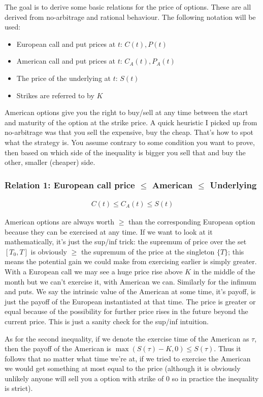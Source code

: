 \documentclass[9pt]{extarticle}
\begin{document}
The goal is to derive some basic relations for the price of options. These are all derived from no-arbitrage and rational behaviour. The following notation will be used:
\begin{itemize}
  \item European call and put prices at $t$: $C(t), P(t)$
  \item American call and put prices at $t$: $C_A(t), P_A(t)$
  \item The price of the underlying at $t$: $S(t)$
  \item Strikes are referred to by $K$
\end{itemize}
American options give you the right to buy/sell at any time between the start and maturity of the option at the strike price. A quick heuristic I picked up 
from no-arbitrage was that you sell the expensive, buy the cheap. That's how to spot what the strategy is. You assume contrary to some condition you want to prove, then 
based on which side of the inequality is bigger you sell that and buy the other, smaller (cheaper) side.
\subsubsection{Relation 1: European call price $\leq$ American $\leq$ Underlying}

\begin{align}
  C(t) \leq C_A(t) \leq S(t)
\end{align}

American options are always worth $\geq $ than the corresponding European option because 
they can be exercised at any time. If we want to look at it mathematically, it's just the sup/inf trick: 
the supremum of price over the set $[T_0,T]$ is obviously $\geq$ the supremum of the price at 
the singleton $\{T\}$; this means the potential gain we could make from exercising earlier is simply 
greater. With a European call we may see a huge price rise above $K$ in the middle of the month but we can't exercise 
it, with American we can. Similarly for the infimum and puts. We say the intrinsic value of the American at some time, it's 
payoff, is just the payoff of the European instantiated at that time. The price is greater or equal because 
of the possibility for further price rises in the future beyond the current price. This is just a sanity check for the 
sup/inf intuition.

As for the second inequality, if we denote the exercise time of the American as $\tau$, then the payoff of the 
American is $\operatorname{max}(S(\tau)-K,0)\leq S(\tau)$. Thus it follows that no matter what time we're at, 
if we tried to exercise the American we would get something at most equal to the price (although it is obviously unlikely 
anyone will sell you a option with strike of $0$ so in practice the inequality is strict).
\end{document}
